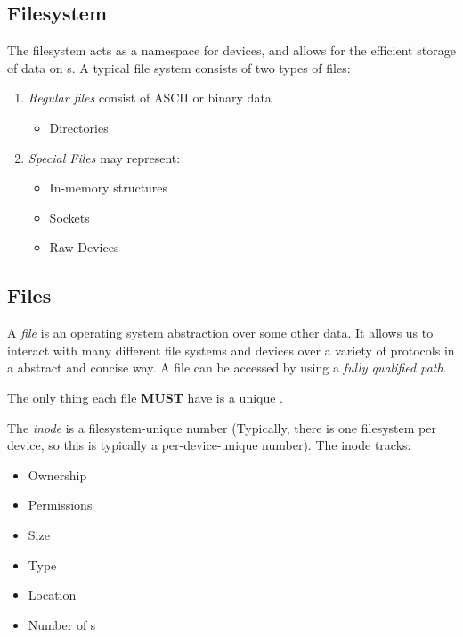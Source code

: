 \subsection{Filesystem}\label{subsec:Filesystem}
The filesystem acts as a namespace for devices, and allows for the efficient storage of data on s.
A typical file system consists of two types of files:
\begin{enumerate}[noitemsep]
\item \textit{Regular files} consist of ASCII or binary data
  \begin{itemize}[noitemsep]
  \item Directories
  \end{itemize}
\item \textit{Special Files} may represent:
  \begin{itemize}[noitemsep]
  \item In-memory structures
  \item Sockets
  \item Raw Devices
  \end{itemize}
\end{enumerate}

\subsection{Files}\label{subsec:Files}
\begin{definition}[File]\label{def:File}
  A \emph{file} is an operating system abstraction over some other data.
  It allows us to interact with many different file systems and devices over a variety of protocols in a abstract and concise way.
  A file can be accessed by using a \textit{fully qualified path}.

  The only thing each file \textbf{MUST} have is a unique .
\end{definition}

\begin{definition}\label{def:inode}
  The \emph{inode} is a filesystem-unique number (Typically, there is one filesystem per device, so this is typically a per-device-unique number).
  The inode tracks:
  \begin{itemize}[noitemsep]
  \item Ownership
  \item Permissions
  \item Size
  \item Type
  \item Location
  \item Number of s
  \end{itemize}
\end{definition}


